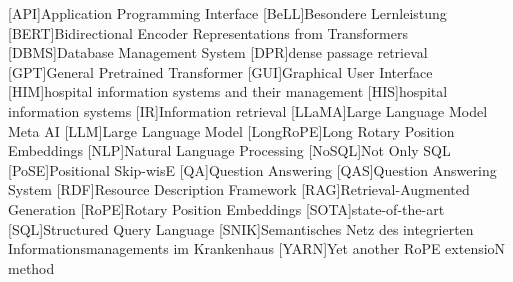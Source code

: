 \begin{acronym}[SPARQL]
[API]{Application Programming Interface}
[BeLL]{Besondere Lernleistung}
[BERT]{Bidirectional Encoder Representations from Transformers}
[DBMS]{Database Management System}
[DPR]{dense passage retrieval}
[GPT]{General Pretrained Transformer}
[GUI]{Graphical User Interface}
[HIM]{hospital information systems and their management}
[HIS]{hospital information systems}
[IR]{Information retrieval}
[LLaMA]{Large Language Model Meta AI}
[LLM]{Large Language Model}
[LongRoPE]{Long Rotary Position Embeddings}
[NLP]{Natural Language Processing}
[NoSQL]{Not Only SQL}
[PoSE]{Positional Skip-wisE}
[QA]{Question Answering}
[QAS]{Question Answering System}
[RDF]{Resource Description Framework}
[RAG]{Retrieval-Augmented Generation}
[RoPE]{Rotary Position Embeddings}
[SOTA]{state-of-the-art}
[SQL]{Structured Query Language}
[SNIK]{Semantisches Netz des integrierten Informationsmanagements im Krankenhaus}
[YARN]{Yet another RoPE extensioN method}
\end{acronym}
